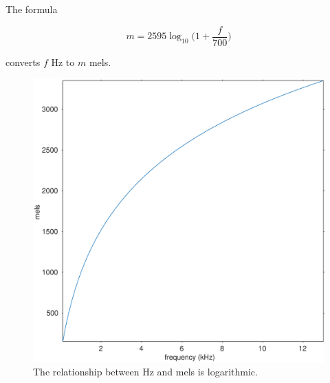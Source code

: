 \documentclass[journal]{IEEEtran}
\begin{document}
The formula

\begin{equation}
  m = 2595 \log_10 \bigg( 1 + \frac{f}{700} \bigg)
\end{equation}

converts $f$ Hz to $m$ mels.

\begin{figure}[h]
	\centering
	\includegraphics[width=\linewidth]{gfx/hz2mel.eps}
	\caption{The relationship between Hz and mels is logarithmic.}
	\label{fig:hz2mel}
\end{figure}
\end{document}
